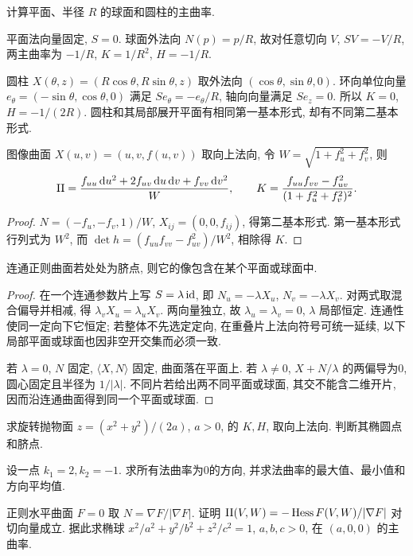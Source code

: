 \begin{example}
计算平面、半径 $R$ 的球面和圆柱的主曲率.
\end{example}
\begin{solution}
平面法向量固定, $S=0$. 球面外法向 $N(p)=p/R$, 故对任意切向 $V$, $SV=-V/R$, 两主曲率为 $-1/R$, $K=1/R^2$, $H=-1/R$.

圆柱 $X(\theta,z)=(R\cos\theta,R\sin\theta,z)$ 取外法向 $(\cos\theta,\sin\theta,0)$. 环向单位向量 $e_\theta=(-\sin\theta,\cos\theta,0)$ 满足 $Se_\theta=-e_\theta/R$, 轴向向量满足 $Se_z=0$. 所以 $K=0$, $H=-1/(2R)$. 圆柱和其局部展开平面有相同第一基本形式, 却有不同第二基本形式.
\end{solution}
\begin{proposition}\label{prop:graph-curvature}
图像曲面 $X(u,v)=(u,v,f(u,v))$ 取向上法向, 令 $W=\sqrt{1+f_u^2+f_v^2}$, 则
\[
 \mathrm{II}=\frac{f_{uu}\,\mathrm d u^2+2f_{uv}\,\mathrm d u\,\mathrm d v+f_{vv}\,\mathrm d v^2}{W},\qquad
 K=\frac{f_{uu}f_{vv}-f_{uv}^2}{(1+f_u^2+f_v^2)^2}.
\]
\end{proposition}
\begin{proof}
$N=(-f_u,-f_v,1)/W$, $X_{ij}=(0,0,f_{ij})$, 得第二基本形式. 第一基本形式行列式为 $W^2$, 而 $\det h=(f_{uu}f_{vv}-f_{uv}^2)/W^2$, 相除得 $K$.
\end{proof}
\begin{theorem}\label{thm:umbilic}
连通正则曲面若处处为脐点, 则它的像包含在某个平面或球面中.
\end{theorem}
\begin{proof}
在一个连通参数片上写 $S=\lambda\operatorname{id}$, 即 $N_u=-\lambda X_u$, $N_v=-\lambda X_v$. 对两式取混合偏导并相减, 得 $\lambda_vX_u=\lambda_uX_v$. 两向量独立, 故 $\lambda_u=\lambda_v=0$, $\lambda$ 局部恒定. 连通性使同一定向下它恒定; 若整体不先选定定向, 在重叠片上法向符号可统一延续, 以下局部平面或球面也因非空开交集而必须一致.

若 $\lambda=0$, $N$ 固定, $\langle X,N\rangle$ 固定, 曲面落在平面上. 若 $\lambda\ne0$, $X+N/\lambda$ 的两偏导为0, 圆心固定且半径为 $1/|\lambda|$. 不同片若给出两不同平面或球面, 其交不能含二维开片, 因而沿连通曲面得到同一个平面或球面.
\end{proof}
\begin{exercise}\label{ex:5a}
求旋转抛物面 $z=(x^2+y^2)/(2a)$, $a>0$, 的 $K,H$, 取向上法向. 判断其椭圆点和脐点.
\end{exercise}
\begin{exercise}\label{ex:5b}
设一点 $k_1=2,k_2=-1$. 求所有法曲率为0的方向, 并求法曲率的最大值、最小值和方向平均值.
\end{exercise}
\begin{exercise}\label{ex:5c}
正则水平曲面 $F=0$ 取 $N=\nabla F/|\nabla F|$. 证明 $\mathrm{II}(V,W)=-\operatorname{Hess}F(V,W)/|\nabla F|$ 对切向量成立. 据此求椭球 $x^2/a^2+y^2/b^2+z^2/c^2=1$, $a,b,c>0$, 在 $(a,0,0)$ 的主曲率.
\end{exercise}

